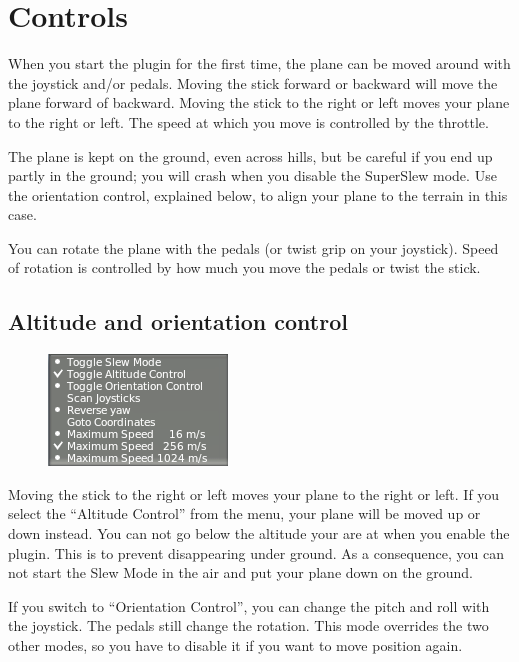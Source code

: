 \documentclass[a4paper,12pt]{article}
\begin{document}
\clearpage
\section*{Controls}

When you start the plugin for the first time, the plane can be moved
around with the joystick and/or pedals. Moving the stick forward or
backward will move the plane forward of backward. Moving the stick to
the right or left moves your plane to the right or left.  The speed at
which you move is controlled by the throttle.

The plane is kept on the ground, even across hills, but be careful if you end up
partly in the ground; you will crash when you disable the SuperSlew mode. Use
the orientation control, explained below, to align your plane to the terrain in
this case.

\vspace{0.5\baselineskip}
You can rotate the plane with the pedals (or twist grip on your
joystick). Speed of rotation is controlled by how much you move the
pedals or twist the stick.

\subsection*{Altitude and orientation control}

\begin{figure}[h!]%
\centering
\includegraphics[scale=1]{slewaltitude.png}
\label{fig:slewaltitude}
\end{figure}

Moving the stick to the right or left moves your plane to the right or
left. If you select the ``Altitude Control'' from the menu, your plane
will be moved up or down instead. You can not go below the altitude
your are at when you enable the plugin. This is to prevent
disappearing under ground. As a consequence, you can not start the
Slew Mode in the air and put your plane down on the ground.

\vspace{0.5\baselineskip}
If you switch to ``Orientation Control'', you can change the pitch and
roll with the joystick. The pedals still change the rotation. This
mode overrides the two other modes, so you have to disable it if you
want to move position again.
\end{document}
